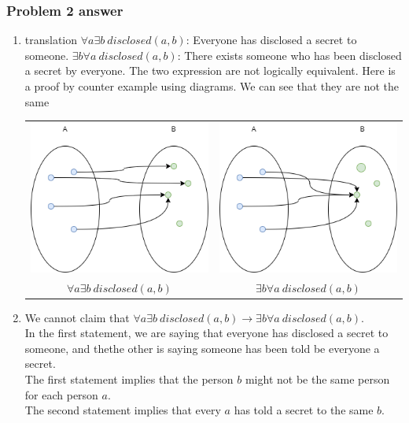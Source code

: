\documentclass[12pt]{article}
\begin{document}
\subsubsection{Problem 2 answer}
\begin{enumerate}
\item translation
	\subitem $\forall a \exists b~disclosed(a, b)$: Everyone has disclosed a secret to someone. 
	\subitem $\exists b \forall a ~disclosed(a, b)$: There exists someone who has been disclosed a secret by everyone.
	The two expression are not logically equivalent. Here is a proof by counter example using diagrams. We can see that they are not the same
	\begin{center}
	\begin{tabular}{cc}
		\includegraphics[scale=0.5] {all-a-told-some-b.png}  &
		\includegraphics[scale=0.5] {some-b-has-been-told-by-all-a}\\
		$\forall a \exists b~disclosed(a, b)$ &
		$\exists b \forall a ~disclosed(a, b)$\\
	\end{tabular}
	\end{center}

\item We cannot claim that $\forall a \exists b~disclosed(a, b) \rightarrow \exists b \forall a ~disclosed(a, b)$.\\
	In the first statement, we are saying that everyone has disclosed a secret to someone, and thethe other is saying someone has been told be everyone a secret.\\
	The first statement implies that the person $b$ might not be the same person for each person $a$. \\
	The second statement implies that every $a$ has told a secret to the same $b$.


\end{enumerate}
\end{document}
